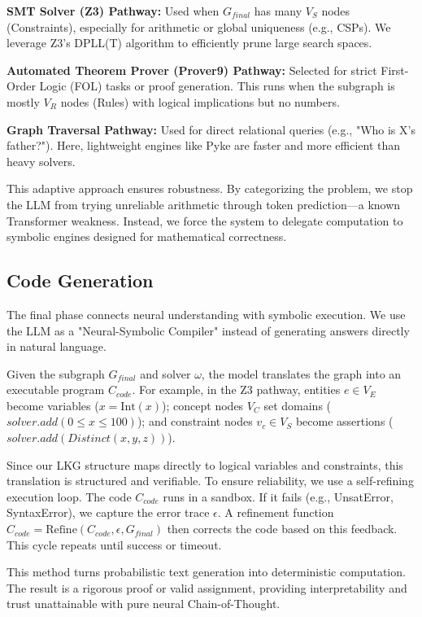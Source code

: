 \documentclass{article}
\theoremstyle{plain}
\theoremstyle{definition}
\theoremstyle{remark}
\begin{document}
\textbf{SMT Solver (Z3) Pathway:} Used when $G_{final}$ has many $V_S$ nodes (Constraints), especially for arithmetic or global uniqueness (e.g., CSPs). We leverage Z3's DPLL(T) algorithm \cite{nieuwenhuis2006solving} to efficiently prune large search spaces.

\textbf{Automated Theorem Prover (Prover9) Pathway:} Selected for strict First-Order Logic (FOL) tasks or proof generation. This runs when the subgraph is mostly $V_R$ nodes (Rules) with logical implications but no numbers.

\textbf{Graph Traversal Pathway:} Used for direct relational queries (e.g., "Who is X's father?"). Here, lightweight engines like Pyke are faster and more efficient than heavy solvers.

This adaptive approach ensures robustness. By categorizing the problem, we stop the LLM from trying unreliable arithmetic through token prediction—a known Transformer weakness. Instead, we force the system to delegate computation to symbolic engines designed for mathematical correctness.


\subsection{Code Generation}

The final phase connects neural understanding with symbolic execution. We use the LLM as a "Neural-Symbolic Compiler" instead of generating answers directly in natural language.

Given the subgraph $G_{final}$ and solver $\omega$, the model translates the graph into an executable program $C_{code}$.
For example, in the Z3 pathway, entities $e \in V_E$ become variables ($x = \text{Int}(x)$); concept nodes $V_C$ set domains ($solver.add(0 \le x \le 100)$); and constraint nodes $v_c \in V_S$ become assertions ($solver.add(Distinct(x, y, z))$).

Since our LKG structure maps directly to logical variables and constraints, this translation is structured and verifiable. To ensure reliability, we use a self-refining execution loop. The code $C_{code}$ runs in a sandbox. If it fails (e.g., UnsatError, SyntaxError), we capture the error trace $\epsilon$. A refinement function $C_{code} = \text{Refine}(C_{code}, \epsilon, G_{final})$ then corrects the code based on this feedback. This cycle repeats until success or timeout.

This method turns probabilistic text generation into deterministic computation. The result is a rigorous proof or valid assignment, providing interpretability and trust unattainable with pure neural Chain-of-Thought.
\end{document}
